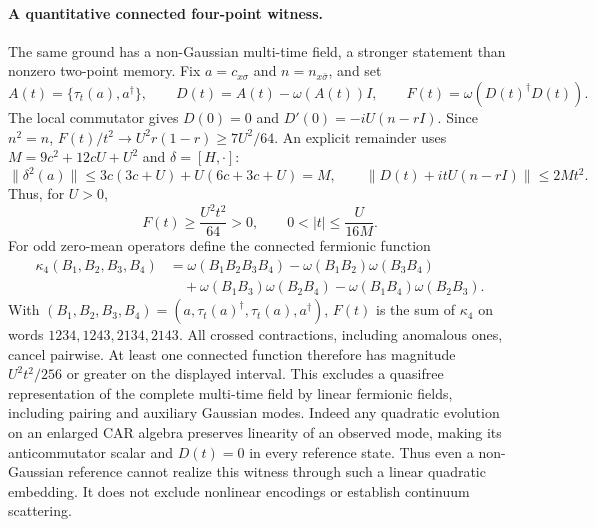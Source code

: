 \paragraph{A quantitative connected four-point witness.}
The same ground has a non-Gaussian multi-time field, a stronger statement
than nonzero two-point memory.  Fix $a=c_{x\sigma}$ and
$n=n_{x\bar\sigma}$, and set
\[
 A(t)=\{\tau_t(a),a^\dagger\},\qquad
 D(t)=A(t)-\omega(A(t))I,\qquad
 F(t)=\omega(D(t)^\dagger D(t)).
\]
The local commutator gives $D(0)=0$ and
$D'(0)=-iU(n-rI)$.  Since $n^2=n$,
$F(t)/t^2\to U^2r(1-r)\geq7U^2/64$.
An explicit remainder uses
$M=9c^2+12cU+U^2$ and $\delta=[H,\cdot]$:
\[
 \|\delta^2(a)\|
 \leq3c(3c+U)+U(6c+3c+U)=M,
 \qquad \|D(t)+itU(n-rI)\|\leq2Mt^2.
\]
Thus, for $U>0$,
\[
 F(t)\geq\frac{U^2t^2}{64}>0,
 \qquad 0<|t|\leq\frac{U}{16M}.
\]
For odd zero-mean operators define the connected fermionic function
\begin{align*}
 \kappa_4(B_1,B_2,B_3,B_4)
 &=\omega(B_1B_2B_3B_4)
   -\omega(B_1B_2)\omega(B_3B_4)\\
 &\quad+\omega(B_1B_3)\omega(B_2B_4)
   -\omega(B_1B_4)\omega(B_2B_3).
\end{align*}
With $(B_1,B_2,B_3,B_4)=(a,\tau_t(a)^\dagger,\tau_t(a),a^\dagger)$,
$F(t)$ is the sum of $\kappa_4$ on words $1234,1243,2134,2143$.
All crossed contractions, including anomalous ones, cancel pairwise.
At least one connected function therefore has magnitude
$U^2t^2/256$ or greater on the displayed interval.  This excludes a
quasifree representation of the complete multi-time field by linear
fermionic fields, including pairing and auxiliary Gaussian modes.
Indeed any quadratic evolution on an enlarged CAR algebra preserves
linearity of an observed mode, making its anticommutator scalar and
$D(t)=0$ in every reference state.  Thus even a non-Gaussian reference
cannot realize this witness through such a linear quadratic embedding.
It does not exclude nonlinear encodings or establish continuum scattering.

